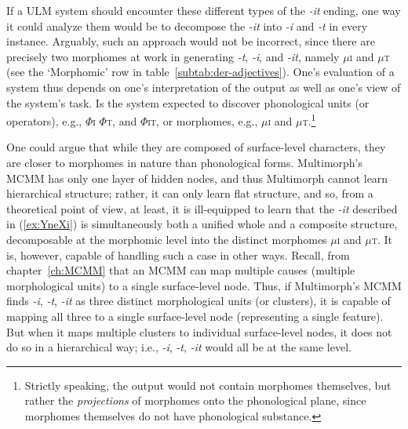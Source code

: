 If a ULM system should encounter these different types of the \textit{-it} ending, one way it could analyze them would be to decompose the \textit{-it} into \textit{-i}  and \textit{-t} in every instance.
Arguably, such an approach would not be incorrect,
since there are precisely two morphomes at work in generating \textit{-t}, \textit{-i}, and \textit{-it}, 
 namely $\mu$\textsc{i} and $\mu$\textsc{t} (see the `Morphomic' row in table~\ref{subtab:der-adjectives}).
One's evaluation of a system thus depends on one's interpretation of the output as well as one's view of the system's 
task. Is the system  expected to discover phonological units (or operators), e.g., $\Phi$\textsc{i} $\Phi$\textsc{t}, and $\Phi$\textsc{it}, or 
morphomes, e.g., 
$\mu$\textsc{i} and $\mu$\textsc{t}.\footnote{Strictly speaking, the output would not contain morphomes themselves, but rather the \emph{projections} of morphomes onto 
the phonological plane, since morphomes themselves do not have phonological substance.}

One could argue that while they are composed of surface-level characters,
they are closer to morphomes in nature than phonological forms.
 Multimorph's MCMM has only one layer of hidden nodes,
and thus Multimorph cannot learn hierarchical structure; rather, it can only learn 
flat structure, and so, from a theoretical point of view, at least, it is ill-equipped to learn
that the \textit{-it} described in (\ref{ex:YneXi}) is simultaneously 
both a unified whole and a composite structure,
decomposable at the morphomic level into the distinct morphomes 
$\mu$\textsc{i} and $\mu$\textsc{t}.
It is, however, capable of handling such a case in other ways. 
Recall, from chapter~\ref{ch:MCMM} 
that an MCMM can map multiple causes (multiple morphological units)
 to a single surface-level node. Thus, if Multimorph's MCMM finds 
 \textit{-i}, \textit{-t}, \textit{-it} as three distinct
 morphological units (or clusters), it is capable of mapping all three 
 to a single surface-level node (representing a single feature). 
 But when it maps multiple clusters to individual surface-level nodes, 
 it does not do so in a hierarchical way; i.e., \textit{-i}, \textit{-t}, \textit{-it} would
 all be at the same level. %

